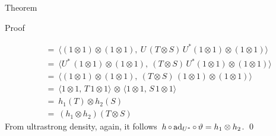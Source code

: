 \begin{parsec}
\begin{point}{Theorem}
\begin{point}{Proof}
\begin{point}
\begin{align*}
        & \ = \ \langle (1 \otimes 1) \otimes (1 \otimes 1),
                        \ U\, (T \otimes S)\, U^*(1 \otimes 1) \otimes (1 \otimes 1)
                        \rangle \\
        & \ = \ \langle U^* \,(1 \otimes 1) \otimes (1 \otimes 1),
                        \  (T \otimes S)\, U^*(1 \otimes 1) \otimes (1 \otimes 1)
                        \rangle \\
        & \ = \ \langle (1 \otimes 1) \otimes (1 \otimes 1),
                        \  (T \otimes S)\, (1 \otimes 1) \otimes (1 \otimes 1)
                        \rangle \\
        & \ = \
        \langle 1 \otimes 1, \,T\, 1\otimes 1\rangle \,\otimes\,
        \langle 1 \otimes 1, \,S\, 1\otimes 1\rangle \\
        & \ = \
        h_1(T) \otimes h_2(S) \\
        & \ = \
        (h_1\otimes h_2)(T \otimes S)
\end{align*}
From ultrastrong density, again, it
    follows~$h \mathop{\circ} \mathrm{ad}_{U^*} \mathop{\circ} \vartheta = h_1 \otimes h_2$. \qed
\end{point}
\end{point}
\end{point}
\end{parsec}

